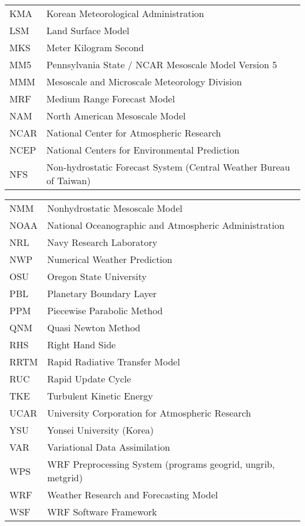 \begin{tabular}[t]{ll}
KMA & Korean Meteorological Administration \\
LSM & Land Surface Model \\
MKS & Meter Kilogram Second \\
MM5 & Pennsylvania State / NCAR Mesoscale Model Version 5 \\
MMM & Mesoscale and Microscale Meteorology Division \\
MRF & Medium Range Forecast Model \\
NAM & North American Mesoscale Model \\
NCAR & National Center for Atmospheric Research \\
NCEP & National Centers for Environmental Prediction \\
NFS & Non-hydrostatic Forecast System (Central Weather Bureau of Taiwan) \\
\end{tabular}
\newpage
\normalsize
\begin{tabular}[t]{ll}
NMM & Nonhydrostatic Mesoscale Model \\
NOAA & National Oceanographic and Atmospheric Administration \\
NRL & Navy Research Laboratory \\
NWP & Numerical Weather Prediction \\
OSU & Oregon State University \\
PBL & Planetary Boundary Layer \\
PPM & Piecewise Parabolic Method \\
QNM & Quasi Newton Method \\
RHS & Right Hand Side \\
RRTM & Rapid Radiative Transfer Model \\
RUC & Rapid Update Cycle \\
TKE & Turbulent Kinetic Energy \\
UCAR & University Corporation for Atmospheric Research \\
YSU & Yonsei University (Korea) \\
VAR & Variational Data Assimilation \\
WPS & WRF Preprocessing System (programs geogrid, ungrib, metgrid) \\
WRF & Weather Research and Forecasting Model \\
WSF & WRF Software Framework \\
\end{tabular}
